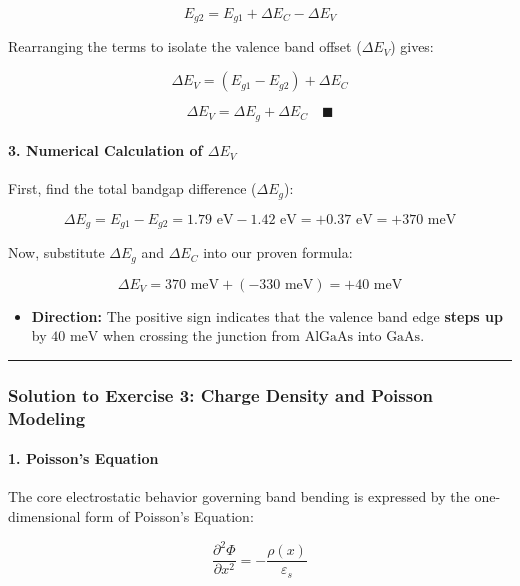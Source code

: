 \documentclass[
]{article}
\providecommand{\tightlist}{%
  \setlength{\itemsep}{0pt}\setlength{\parskip}{0pt}}
\begin{document}
\[E_{g2} = E_{g1} + \Delta E_C - \Delta E_V\]

Rearranging the terms to isolate the valence band offset
(\(\Delta E_V\)) gives:

\[\Delta E_V = (E_{g1} - E_{g2}) + \Delta E_C\]

\[\Delta E_V = \Delta E_g + \Delta E_C \quad \blacksquare\]

\paragraph{\texorpdfstring{3. Numerical Calculation of
\(\Delta E_V\)}{3. Numerical Calculation of \textbackslash Delta E\_V}}\label{numerical-calculation-of-delta-e_v}

First, find the total bandgap difference (\(\Delta E_g\)):

\[\Delta E_g = E_{g1} - E_{g2} = 1.79\text{ eV} - 1.42\text{ eV} = +0.37\text{ eV} = +370\text{ meV}\]

Now, substitute \(\Delta E_g\) and \(\Delta E_C\) into our proven
formula:

\[\Delta E_V = 370\text{ meV} + (-330\text{ meV}) = +40\text{ meV}\]

\begin{itemize}
\tightlist
\item
  \textbf{Direction:} The positive sign indicates that the valence band
  edge \textbf{steps up} by \(40\text{ meV}\) when crossing the junction
  from \(\text{AlGaAs}\) into \(\text{GaAs}\).
\end{itemize}

\begin{center}\rule{0.5\linewidth}{0.5pt}\end{center}

\subsubsection{Solution to Exercise 3: Charge Density and Poisson
Modeling}\label{solution-to-exercise-3-charge-density-and-poisson-modeling}

\paragraph{1. Poisson's Equation}\label{poissons-equation}

The core electrostatic behavior governing band bending is expressed by
the one-dimensional form of Poisson's Equation:

\[\frac{\partial^2 \Phi}{\partial x^2} = -\frac{\rho(x)}{\varepsilon_s}\]
\end{document}
